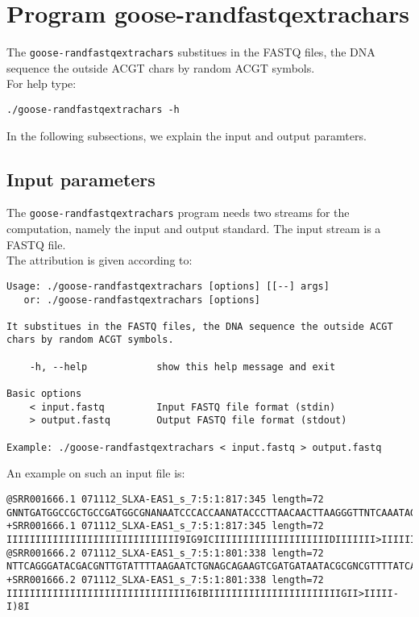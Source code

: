 \section{Program goose-randfastqextrachars}
The \texttt{goose-randfastqextrachars} substitues in the FASTQ files, the DNA sequence the outside ACGT chars by random ACGT symbols.\\
For help type:
\begin{lstlisting}
./goose-randfastqextrachars -h
\end{lstlisting}
In the following subsections, we explain the input and output paramters.

\subsection*{Input parameters}

The \texttt{goose-randfastqextrachars} program needs two streams for the computation,
namely the input and output standard. The input stream is a FASTQ file.\\
The attribution is given according to:
\begin{lstlisting}
Usage: ./goose-randfastqextrachars [options] [[--] args]
   or: ./goose-randfastqextrachars [options]

It substitues in the FASTQ files, the DNA sequence the outside ACGT chars by random ACGT symbols.

    -h, --help            show this help message and exit

Basic options
    < input.fastq         Input FASTQ file format (stdin)
    > output.fastq        Output FASTQ file format (stdout)

Example: ./goose-randfastqextrachars < input.fastq > output.fastq
\end{lstlisting}
An example on such an input file is:
\begin{lstlisting}
@SRR001666.1 071112_SLXA-EAS1_s_7:5:1:817:345 length=72
GNNTGATGGCCGCTGCCGATGGCGNANAATCCCACCAANATACCCTTAACAACTTAAGGGTTNTCAAATAGA
+SRR001666.1 071112_SLXA-EAS1_s_7:5:1:817:345 length=72
IIIIIIIIIIIIIIIIIIIIIIIIIIIIII9IG9ICIIIIIIIIIIIIIIIIIIIIDIIIIIII>IIIIII/
@SRR001666.2 071112_SLXA-EAS1_s_7:5:1:801:338 length=72
NTTCAGGGATACGACGNTTGTATTTTAAGAATCTGNAGCAGAAGTCGATGATAATACGCGNCGTTTTATCAN
+SRR001666.2 071112_SLXA-EAS1_s_7:5:1:801:338 length=72
IIIIIIIIIIIIIIIIIIIIIIIIIIIIIIII6IBIIIIIIIIIIIIIIIIIIIIIIIGII>IIIII-I)8I
\end{lstlisting}

